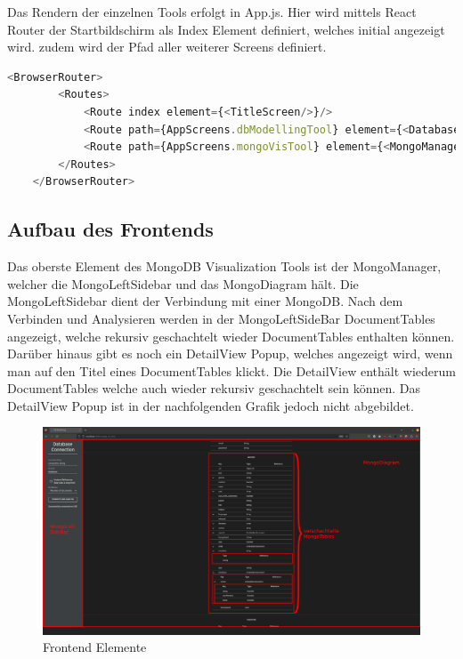 Das Rendern der einzelnen Tools erfolgt in App.js.
Hier wird mittels React Router der Startbildschirm als Index Element definiert, welches initial angezeigt wird.
zudem wird der Pfad aller weiterer Screens definiert.

\begin{lstlisting}[language=JavaScript, caption={React Router in App.js},label={lst:app.js}]
    <BrowserRouter>
        <Routes>
            <Route index element={<TitleScreen/>}/>
            <Route path={AppScreens.dbModellingTool} element={<DatabaseModellingTool/>}/>
            <Route path={AppScreens.mongoVisTool} element={<MongoManager/>}/>
        </Routes>
    </BrowserRouter>
\end{lstlisting}

\subsection{Aufbau des Frontends}
\label{sub:fe_aufbau}
Das oberste Element des MongoDB Visualization Tools ist der MongoManager, welcher die MongoLeftSidebar und das MongoDiagram hält.
Die MongoLeftSidebar dient der Verbindung mit einer MongoDB.
Nach dem Verbinden und Analysieren werden in der MongoLeftSideBar DocumentTables angezeigt, welche rekursiv geschachtelt wieder DocumentTables enthalten können.
Darüber hinaus gibt es noch ein DetailView Popup, welches angezeigt wird, wenn man auf den Titel eines DocumentTables klickt.
Die DetailView enthält wiederum DocumentTables welche auch wieder rekursiv geschachtelt sein können.
Das DetailView Popup ist in der nachfolgenden Grafik jedoch nicht abgebildet.

\begin{figure}[H]
    \includegraphics[width=\textwidth]{images/frontend_layers}
    \caption{Frontend Elemente}
    \label{fig:frontend_layers}
\end{figure}

